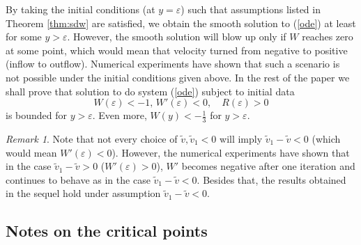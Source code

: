 \documentclass[reqno]{article}%
\theoremstyle{plain}
\theoremstyle{definition}
\theoremstyle{remark}
\newtheorem{remark}{Remark}[section]
\numberwithin{equation}{section}
\begin{document}



\medskip

By taking the initial conditions (at $y=\varepsilon$) such that assumptions listed in Theorem \ref{thm:sdw} are satisfied, we obtain the smooth solution to (\ref{ode}) at least for some $y>\varepsilon$. However, the smooth solution will blow up only if $W$ reaches zero at some point, which would mean that velocity  turned from negative to positive (inflow to outflow). 
Numerical experiments have shown that such a scenario is not possible under the initial conditions given above.
In the rest of the paper we shall prove that solution to do system (\ref{ode}) subject to initial data
\[W(\varepsilon)<-1,\, W'(\varepsilon)<0,\quad R(\varepsilon)>0\]
is bounded for $y>\varepsilon$. Even more, $W(y)<-\frac{1}{3}$ for $y>\varepsilon.$

\begin{remark}
Note that not every choice of  $\tilde{v},\tilde{v}_1<0$ will imply $\tilde{v}_1-\tilde{v}<0$ (which would mean $W'(\varepsilon)<0$). However, the numerical experiments have shown that  in the case $\tilde{v}_1-\tilde{v}>0$ ($W'(\varepsilon)>0$), $W'$ becomes negative after one iteration and continues to behave as in the case $\tilde{v}_1-\tilde{v}<0$. Besides that, the results obtained in the sequel hold under assumption $\tilde{v}_1-\tilde{v}<0$.
\end{remark}

\subsection{Notes on the critical points}
\end{document}
